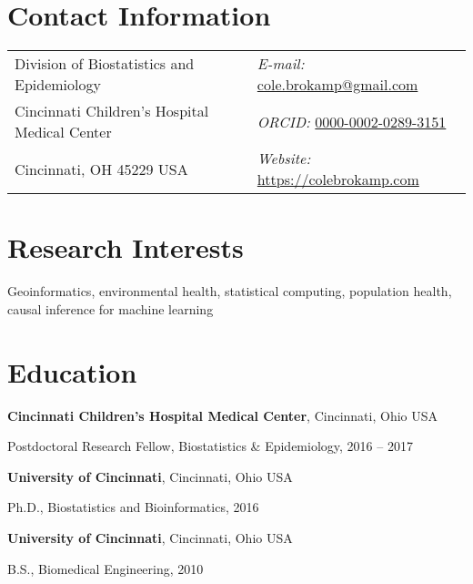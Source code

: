 \documentclass[margin,line]{res}
\newenvironment{list1}{
  \begin{list}{\ding{113}}{%
      \setlength{\itemsep}{0in}
      \setlength{\parsep}{0in} \setlength{\parskip}{0in}
      \setlength{\topsep}{0in} \setlength{\partopsep}{0in}
      \setlength{\leftmargin}{0.17in}}}{\end{list}}
\begin{document}

\begin{resume}
\section{\sc Contact Information}
\vspace{.05in}
\begin{tabular}{@{}p{3in}p{4in}}
  Division of Biostatistics and Epidemiology & {\it E-mail:}  \href{mailto:cole.brokamp@gmail.com}{cole.brokamp@gmail.com}\\
  Cincinnati Children's Hospital Medical Center & {\it ORCID:} \href{https://orcid.org/0000-0002-0289-3151}{0000-0002-0289-3151}\\
  Cincinnati, OH 45229 USA  & {\it Website:} \href{https://colebrokamp.com}{https://colebrokamp.com} \\
\end{tabular}


\section{\sc Research Interests}
Geoinformatics, environmental health, statistical computing, population health,
causal inference for machine learning

\section{\sc Education}

{\bf Cincinnati Children's Hospital Medical Center}, Cincinnati, Ohio USA \\
\vspace*{-.1in}
\begin{list1}
\item[]Postdoctoral Research Fellow, Biostatistics \& Epidemiology, 2016 -- 2017
\end{list1}

{\bf University of Cincinnati}, Cincinnati, Ohio USA \\
\vspace*{-.1in}
\begin{list1}
\item[]Ph.D., Biostatistics and Bioinformatics, 2016
\end{list1}

{\bf University of Cincinnati}, Cincinnati, Ohio USA\\
\vspace*{-.1in}
\begin{list1}
\item[]B.S., Biomedical Engineering, 2010
\end{list1}



\end{resume}
\end{document}
